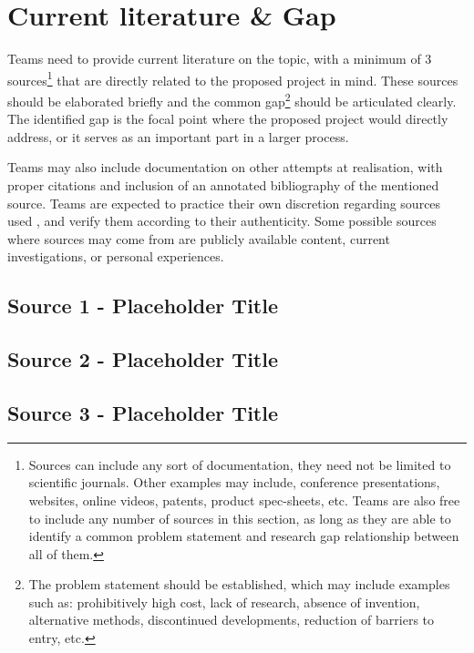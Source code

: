 \documentclass{report}
\begin{document}
	\section{Current literature \& Gap }
 
        Teams need to provide current literature on the topic, with a minimum of 3 sources\footnote{Sources can include any sort of documentation, they need not be limited to scientific journals. Other examples may include, conference presentations, websites, online videos, patents, product spec-sheets, etc. Teams are also free to include any number of sources in this section, as long as they are able to identify a common problem statement and research gap relationship between all of them.} that are directly related to the proposed project in mind. These sources should be elaborated briefly and the common gap\footnote{The problem statement should be established, which may include examples such as: prohibitively high cost, lack of research, absence of invention, alternative methods, discontinued developments, reduction of barriers to entry, etc.} should be articulated clearly. The identified gap is the focal point where the proposed project would directly address, or it serves as an important part in a larger process. 
        \newline

        \noindent
        Teams may also include documentation on other attempts at realisation, with proper citations and inclusion of an annotated bibliography of the mentioned source. Teams are expected to practice their own discretion regarding sources used , and verify them according to their authenticity. Some possible sources where sources may come from are publicly available content, current investigations, or personal experiences. 
        
        \subsection{Source 1 - Placeholder Title}
        \lipsum[66]

        \subsection{Source 2 - Placeholder Title}
        \lipsum[75]

        \subsection{Source 3 - Placeholder Title}
        \lipsum[66]
\end{document}

